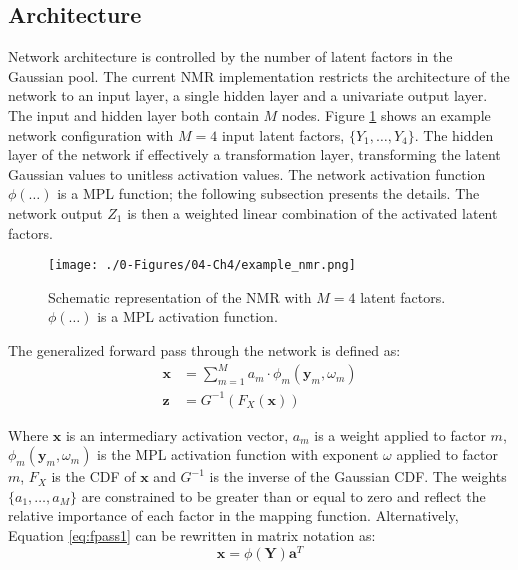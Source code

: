 \subsection{Architecture}
\label{subsec:04arch}

Network architecture is controlled by the number of latent factors in the Gaussian pool. The current \gls{NMR} implementation restricts the architecture of the network to an input layer, a single hidden layer and a univariate output layer. The input and hidden layer both contain $M$ nodes. Figure \ref{fig:example_nmr} shows an example network configuration with $M=4$ input latent factors, $\{ Y_{1}, \dots, Y_{4}\}$. The hidden layer of the network if effectively a transformation layer, transforming the latent Gaussian values to unitless activation values. The network activation function $\phi(\dots)$ is a \gls{MPL} function; the following subsection presents the details. The network output $Z_{1}$ is then a weighted linear combination of the activated latent factors.

\begin{figure}[htb!]
    \centering
    \texttt{[image: ./0-Figures/04-Ch4/example\_nmr.png]}
    \caption{Schematic representation of the \gls{NMR} with $M=4$ latent factors. $\phi(\dots)$ is a \gls{MPL} activation function. }
    \label{fig:example_nmr}
\end{figure}

The generalized forward pass through the network is defined as:
\begin{align}
    \label{eq:fpass1}
    \mathbf{x} & = \sum_{m=1}^{M}a_{m} \cdot \phi_{m}(\mathbf{y}_{m}, \omega_{m}) \\
    \label{eq:fpass2}
    \mathbf{z} & = G^{-1}\left( F_{X}\left(\mathbf{x} \right)\right)
\end{align}

Where $\mathbf{x}$ is an intermediary activation vector, $a_{m}$ is a weight applied to factor $m$, $\phi_{m}(\mathbf{y}_{m}, \omega_{m})$ is the \gls{MPL} activation function with exponent $\omega$ applied to factor $m$, $F_{X}$ is the \gls{CDF} of $\mathbf{x}$ and $G^{-1}$ is the inverse of the Gaussian \gls{CDF}. The weights $\{ a_{1}, \dots, a_{M}\}$ are constrained to be greater than or equal to zero and reflect the relative importance of each factor in the mapping function. Alternatively, Equation \ref{eq:fpass1} can be rewritten in matrix notation as:
\begin{equation}
    \mathbf{x} = \phi\left( \mathbf{Y} \right) \mathbf{a}^{T}
    \label{eq:fpass3}
\end{equation}

